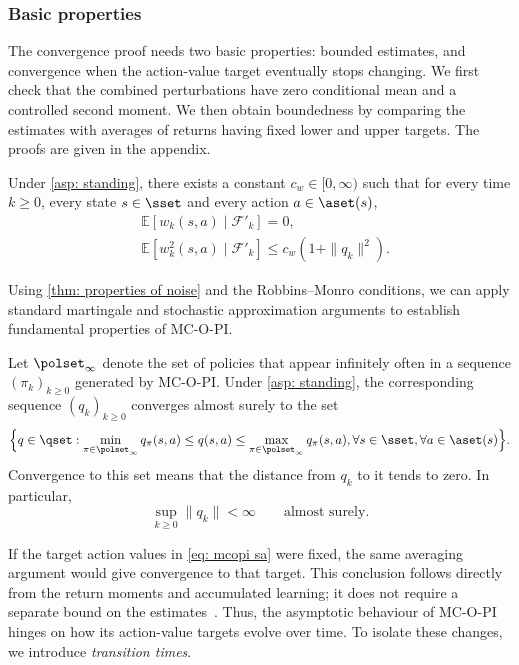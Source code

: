 \subsubsection{Basic properties}
\label{sec: replacement foundations}
The convergence proof needs two basic properties: bounded estimates, and convergence when the action-value target eventually stops changing.
We first check that the combined perturbations have zero conditional mean and a controlled second moment. We then obtain boundedness by comparing the estimates with averages of returns having fixed lower and upper targets. The proofs are given in the appendix.

\begin{lemma}
\label{thm: properties of noise}
Under \autoref{asp: standing}, there exists a constant $c_w \in [0, \infty)$
such that for every time $k \ge 0$, every state $s \in \sset$ and every action $a \in \aset(s)$,
\begin{align}
\label{eq: muw_mds}
&\mathbb E\!\left[w_k(s,a) \mid \mathcal F'_k\right] = 0,
\\
\label{eq: muw_second_moment}
&\mathbb E\!\left[w_k^2(s,a) \mid \mathcal F'_k\right]
\le c_w(1+\|q_k\|^2) .
\end{align}
\end{lemma}

Using \autoref{thm: properties of noise} and the Robbins--Monro conditions,
we can apply standard martingale and stochastic approximation arguments to establish fundamental properties of MC-O-PI.

\begin{lemma}
\label{thm: bounded limit sets}
Let $\polset_\infty$ denote the set of policies that appear infinitely often in a sequence $(\pi_k)_{k \ge 0}$ generated by MC-O-PI.
Under \autoref{asp: standing}, the corresponding sequence $(q_k)_{k \ge 0}$ converges almost surely to the set
\begin{align*}
    \Big\{
    q \in \qset :
    \min_{\pi \in \polset_\infty} q_\pi(s,a) \leq q(s,a) \leq \max_{\pi \in \polset_\infty} q_\pi(s,a), \forall s \in \sset, \forall a \in \aset(s)
    \Big\} .
\end{align*}
Convergence to this set means that the distance from $q_k$ to it tends to zero. In particular,
\[
\sup_{k\ge0}\|q_k\|<\infty\qquad\text{almost surely}.
\]
\end{lemma}

If the target action values in \eqref{eq: mcopi sa} were fixed, the same averaging argument would give convergence to that target. This conclusion follows directly from the return moments and accumulated learning; it does not require a separate bound on the estimates~\citep[Proposition~4.2]{Bertsekas1996Neuro-DynamicProgramming}.
Thus, the asymptotic behaviour of MC-O-PI hinges on how its action-value targets evolve over time. To isolate these changes, we introduce \textit{transition times}.


